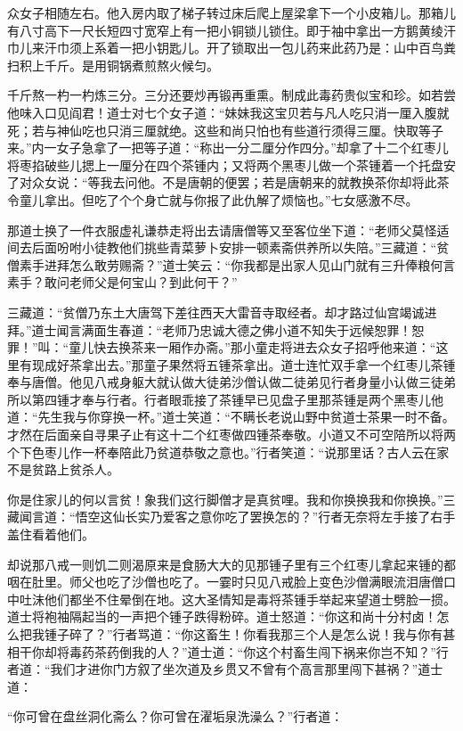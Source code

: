 \documentclass[12pt,UTF8]{ctexbook}
\begin{document}
众女子相随左右。他入房内取了梯子转过床后爬上屋梁拿下一个小皮箱儿。那箱儿有八寸高下一尺长短四寸宽窄上有一把小铜锁儿锁住。即于袖中拿出一方鹅黄绫汗巾儿来汗巾须上系着一把小钥匙儿。开了锁取出一包儿药来此药乃是：山中百鸟粪扫积上千斤。是用铜锅煮煎熬火候匀。

千斤熬一杓一杓炼三分。三分还要炒再锻再重熏。制成此毒药贵似宝和珍。如若尝他味入口见阎君！道士对七个女子道：“妹妹我这宝贝若与凡人吃只消一厘入腹就死；若与神仙吃也只消三厘就绝。这些和尚只怕也有些道行须得三厘。快取等子来。”内一女子急拿了一把等子道：“称出一分二厘分作四分。”却拿了十二个红枣儿将枣掐破些儿揌上一厘分在四个茶锺内；又将两个黑枣儿做一个茶锺着一个托盘安了对众女说：“等我去问他。不是唐朝的便罢；若是唐朝来的就教换茶你却将此茶令童儿拿出。但吃了个个身亡就与你报了此仇解了烦恼也。”七女感激不尽。

那道士换了一件衣服虚礼谦恭走将出去请唐僧等又至客位坐下道：“老师父莫怪适间去后面吩咐小徒教他们挑些青菜萝卜安排一顿素斋供养所以失陪。”三藏道：“贫僧素手进拜怎么敢劳赐斋？”道士笑云：“你我都是出家人见山门就有三升俸粮何言素手？敢问老师父是何宝山？到此何干？”

三藏道：“贫僧乃东土大唐驾下差往西天大雷音寺取经者。却才路过仙宫竭诚进拜。”道士闻言满面生春道：“老师乃忠诚大德之佛小道不知失于远候恕罪！恕罪！”叫：“童儿快去换茶来一厢作办斋。”那小童走将进去众女子招呼他来道：“这里有现成好茶拿出去。”那童子果然将五锺茶拿出。道士连忙双手拿一个红枣儿茶锺奉与唐僧。他见八戒身躯大就认做大徒弟沙僧认做二徒弟见行者身量小认做三徒弟所以第四锺才奉与行者。行者眼乖接了茶锺早已见盘子里那茶锺是两个黑枣儿他道：“先生我与你穿换一杯。”道士笑道：“不瞒长老说山野中贫道士茶果一时不备。才然在后面亲自寻果子止有这十二个红枣做四锺茶奉敬。小道又不可空陪所以将两个下色枣儿作一杯奉陪此乃贫道恭敬之意也。”行者笑道：“说那里话？古人云在家不是贫路上贫杀人。

你是住家儿的何以言贫！象我们这行脚僧才是真贫哩。我和你换换我和你换换。”三藏闻言道：“悟空这仙长实乃爱客之意你吃了罢换怎的？”行者无奈将左手接了右手盖住看着他们。

却说那八戒一则饥二则渴原来是食肠大大的见那锺子里有三个红枣儿拿起来锺的都咽在肚里。师父也吃了沙僧也吃了。一霎时只见八戒脸上变色沙僧满眼流泪唐僧口中吐沫他们都坐不住晕倒在地。这大圣情知是毒将茶锺手举起来望道士劈脸一掼。道士将袍袖隔起当的一声把个锺子跌得粉碎。道士怒道：“你这和尚十分村卤！怎么把我锺子碎了？”行者骂道：“你这畜生！你看我那三个人是怎么说！我与你有甚相干你却将毒药茶药倒我的人？”道士道：“你这个村畜生闯下祸来你岂不知？”行者道：“我们才进你门方叙了坐次道及乡贯又不曾有个高言那里闯下甚祸？”道士道：

“你可曾在盘丝洞化斋么？你可曾在濯垢泉洗澡么？”行者道：
\end{document}
